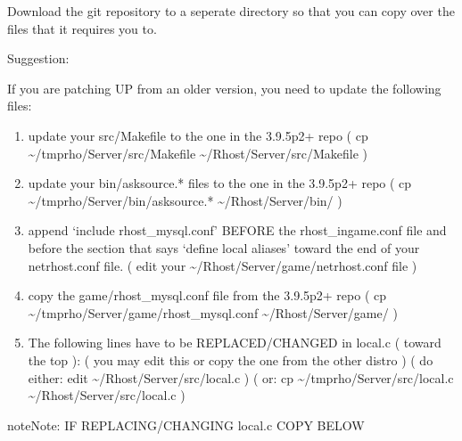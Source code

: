 \documentclass[letterpaper,10pt,english]{sphinxmanual}
\begin{document}
\sphinxAtStartPar
Download the git repository to a seperate directory so that you can
copy over the files that it requires you to.

\sphinxAtStartPar
Suggestion:

\begin{sphinxVerbatim}[commandchars=\\\{\}]
   
\end{sphinxVerbatim}

\sphinxAtStartPar
If you are patching UP from an older version, you need to update
the following files:
\begin{enumerate}
%
\item {} 
\sphinxAtStartPar
update your src/Makefile to the one in the 3.9.5p2+ repo
( cp \textasciitilde{}/tmprho/Server/src/Makefile \textasciitilde{}/Rhost/Server/src/Makefile )

\item {} 
\sphinxAtStartPar
update your bin/asksource.* files to the one in the 3.9.5p2+ repo
( cp \textasciitilde{}/tmprho/Server/bin/asksource.* \textasciitilde{}/Rhost/Server/bin/ )

\item {} 
\sphinxAtStartPar
append ‘include rhost\_mysql.conf’ BEFORE the rhost\_ingame.conf file
and before the section that says ‘define local aliases’ toward the end of
your netrhost.conf file.
( edit your \textasciitilde{}/Rhost/Server/game/netrhost.conf file )

\item {} 
\sphinxAtStartPar
copy the game/rhost\_mysql.conf file from the 3.9.5p2+ repo
( cp \textasciitilde{}/tmprho/Server/game/rhost\_mysql.conf \textasciitilde{}/Rhost/Server/game/ )

\item {} 
\sphinxAtStartPar
The following lines have to be REPLACED/CHANGED in local.c ( toward the top ):
( you may edit this or copy the one from the other distro )
( do either:  edit \textasciitilde{}/Rhost/Server/src/local.c )
(        or:  cp \textasciitilde{}/tmprho/Server/src/local.c \textasciitilde{}/Rhost/Server/src/local.c )

\end{enumerate}

\begin{sphinxadmonition}{note}{Note:}
\sphinxAtStartPar
IF REPLACING/CHANGING local.c COPY BELOW
\end{sphinxadmonition}
\end{document}
